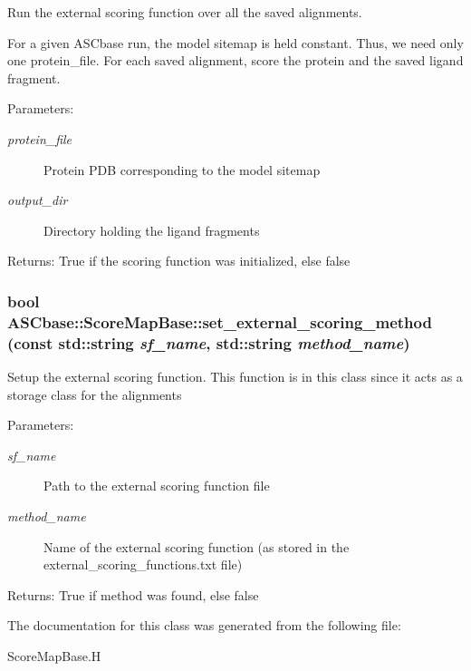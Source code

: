Run the external scoring function over all the saved alignments. 

For a given ASCbase run, the model sitemap is held constant. Thus, we need only one protein\_\-file. For each saved alignment, score the protein and the saved ligand fragment.

\begin{Desc}
\item[Parameters:]
\begin{description}
\item[{\em protein\_\-file}]Protein PDB corresponding to the model sitemap \item[{\em output\_\-dir}]Directory holding the ligand fragments \end{description}
\end{Desc}
\begin{Desc}
\item[Returns:]True if the scoring function was initialized, else false \end{Desc}
\subsubsection{\setlength{\rightskip}{0pt plus 5cm}bool ASCbase::Score\-Map\-Base::set\_\-external\_\-scoring\_\-method (const std::string {\em sf\_\-name}, std::string {\em method\_\-name})\hspace{0.3cm}{\tt  [inline]}}\label{classASCbase_1_1ScoreMapBase_d24ec72fca67bdacb134c71a0e78e9d6}


Setup the external scoring function. This function is in this class since it acts as a storage class for the alignments

\begin{Desc}
\item[Parameters:]
\begin{description}
\item[{\em sf\_\-name}]Path to the external scoring function file \item[{\em method\_\-name}]Name of the external scoring function (as stored in the external\_\-scoring\_\-functions.txt file) \end{description}
\end{Desc}
\begin{Desc}
\item[Returns:]True if method was found, else false \end{Desc}


The documentation for this class was generated from the following file:\begin{CompactItemize}
\item 
Score\-Map\-Base.H\end{CompactItemize}
